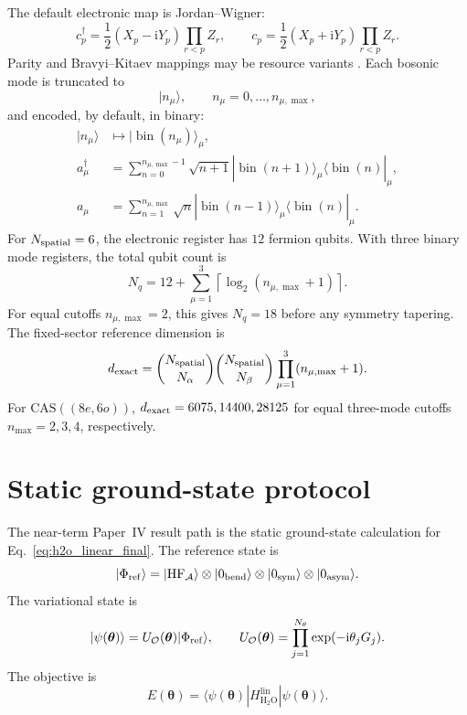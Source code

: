 \documentclass[
  reprint,
  amsmath,
  amssymb,
  aps,
  pra,
  nofootinbib,
  superscriptaddress,
  floatfix
]{revtex4-2}
\newcommand{\ii}{\mathrm{i}}
\newcommand{\comb}[2]{\binom{#1}{#2}}
\newcommand{\ket}[1]{|#1\rangle}
\newcommand{\bra}[1]{\langle #1|}
\newcommand{\Acal}{\mathcal{A}}
\newcommand{\Ocal}{\mathcal{O}}
\newcommand{\HF}{\mathrm{HF}}
\newcommand{\CAS}{\mathrm{CAS}}
\newcommand{\HtwoO}{\mathrm{H_2O}}
\newcommand{\lin}{\mathrm{lin}}
\begin{document}
The default electronic map is Jordan--Wigner:
\begin{equation}
c_p^\dagger
=
\frac12(X_p-\ii Y_p)
\prod_{r<p}Z_r,
\qquad
c_p
=
\frac12(X_p+\ii Y_p)
\prod_{r<p}Z_r .
\label{eq:jordan_wigner}
\end{equation}
Parity and Bravyi--Kitaev mappings may be resource variants \cite{JordanWigner1928,BravyiKitaev2002}.  Each bosonic mode is truncated to
\begin{equation}
\ket{n_\mu},\qquad n_\mu=0,\ldots,n_{\mu,\max},
\label{eq:boson_truncation}
\end{equation}
and encoded, by default, in binary:
\begin{align}
\ket{n_\mu}
&\mapsto
\ket{\operatorname{bin}(n_\mu)}_\mu,
\nonumber\\
a_\mu^\dagger
&=
\sum_{n=0}^{n_{\mu,\max}-1}
\sqrt{n+1}
\ket{\operatorname{bin}(n+1)}_\mu
\bra{\operatorname{bin}(n)}_\mu,
\nonumber\\
a_\mu
&=
\sum_{n=1}^{n_{\mu,\max}}
\sqrt n
\ket{\operatorname{bin}(n-1)}_\mu
\bra{\operatorname{bin}(n)}_\mu .
\label{eq:binary_encoding}
\end{align}
For \(N_{\rm spatial}=6\), the electronic register has \(12\) fermion qubits.  With three binary mode registers, the total qubit count is
\begin{equation}
N_q
=
12+
\sum_{\mu=1}^{3}
\left\lceil
\log_2(n_{\mu,\max}+1)
\right\rceil .
\label{eq:qubit_count}
\end{equation}
For equal cutoffs \(n_{\mu,\max}=2\), this gives \(N_q=18\) before any symmetry tapering.  The fixed-sector reference dimension is
\begin{equation}
d_{\rm exact}
=
\comb{N_{\rm spatial}}{N_\alpha}
\comb{N_{\rm spatial}}{N_\beta}
\prod_{\mu=1}^{3}(n_{\mu,\max}+1).
\label{eq:exact_dimension}
\end{equation}
For \(\CAS((8e,6o))\), \(d_{\rm exact}=6075,14400,28125\) for equal three-mode cutoffs \(n_{\max}=2,3,4\), respectively.

\section{Static ground-state protocol}
\label{sec:static_protocol}

The near-term Paper~IV result path is the static ground-state calculation for Eq.~\eqref{eq:h2o_linear_final}.  The reference state is
\begin{equation}
\ket{\Phi_{\rm ref}}
=
\ket{\HF_{\Acal}}
\otimes
\ket{0_{\rm bend}}
\otimes
\ket{0_{\rm sym}}
\otimes
\ket{0_{\rm asym}} .
\label{eq:h2o_reference}
\end{equation}
The variational state is
\begin{equation}
\ket{\psi(\boldsymbol\theta)}
=
U_{\Ocal}(\boldsymbol\theta)\ket{\Phi_{\rm ref}},
\qquad
U_{\Ocal}(\boldsymbol\theta)
=
\prod_{j=1}^{N_\theta}\exp(-\ii\theta_jG_j).
\label{eq:static_ansatz}
\end{equation}
The objective is
\begin{equation}
E(\boldsymbol\theta)
=
\bra{\psi(\boldsymbol\theta)}
H_{\HtwoO}^{\lin}
\ket{\psi(\boldsymbol\theta)}.
\label{eq:static_energy}
\end{equation}
\end{document}
